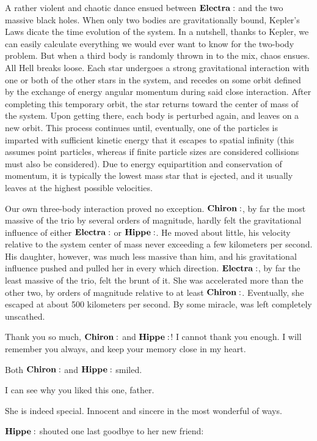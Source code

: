 A rather violent and chaotic dance ensued between $\Electra$ and the two massive black holes.  When only two bodies are gravitationally bound, Kepler's Laws dicate the time evolution of the system.  In a nutshell, thanks to Kepler, we can easily calculate everything we would ever want to know for the two-body problem.  But when a third body is randomly thrown in to the mix, chaos ensues.  All Hell breaks loose.  Each star undergoes a strong gravitational interaction with one or both of the other stars in the system, and recedes on some orbit defined by the exchange of energy angular momentum during said close interaction.  After completing this temporary orbit, the star returns toward the center of mass of the system.  Upon getting there, each body is perturbed again, and leaves on a new orbit.  This process continues until, eventually, one of the particles is imparted with sufficient kinetic energy that it escapes to spatial infinity (this assumes point particles, whereas if finite particle sizes are considered collisions must also be considered).  Due to energy equipartition and conservation of momentum, it is typically the lowest mass star that is ejected, and it usually leaves at the highest possible velocities.  

Our own three-body interaction proved no exception.  $\Chiron$, by far the most massive of the trio by several orders of magnitude, hardly felt the gravitational influence of either $\Electra$ or $\Hippe$.  He moved about little, his velocity relative to the system center of mass never exceeding a few kilometers per second.  His daughter, however, was much less massive than him, and his gravitational influence pushed and pulled her in every which direction.  $\Electra$, by far the least massive of the trio, felt the brunt of it.  She was accelerated more than the other two, by orders of magnitude relative to at least $\Chiron$.  Eventually, she escaped at about 500 kilometers per second.  By some miracle, was left completely unscathed.

\Electra Thank you so much, $\Chiron$ and $\Hippe$!  I cannot thank you enough.  I will remember you always, and keep your memory close in my heart.

Both $\Chiron$ and $\Hippe$ smiled.

\Hippe I can see why you liked this one, father.

\Chiron She is indeed special.  Innocent and sincere in the most wonderful of ways.

$\Hippe$ shouted one last goodbye to her new friend:

